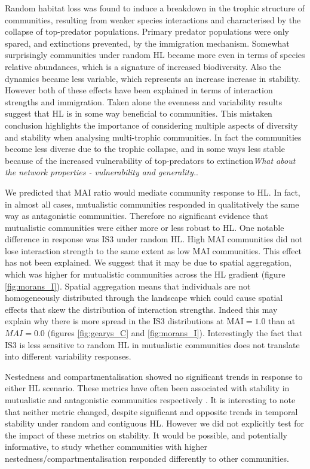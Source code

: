 Random habitat loss was found to induce a breakdown in the trophic structure of communities, resulting from weaker species interactions and characterised by the collapse of top-predator populations. Primary predator populations were only spared, and extinctions prevented, by the immigration mechanism. Somewhat surprisingly communities under random HL became more even in terms of species relative abundances, which is a signature of increased biodiversity. Also the dynamics became less variable, which represents an increase increase in stability. However both of these effects have been explained in terms of interaction strengths and immigration. Taken alone the evenness and variability results suggest that HL is in some way beneficial to communities. This mistaken conclusion highlights the importance of considering multiple aspects of diversity and stability when analysing multi-trophic communities. In fact the communities become less diverse due to the trophic collapse, and in some ways less stable because of the increased vulnerability of top-predators to extinction\emph{What about the network properties - vulnerability and generality.}.

We predicted that MAI ratio would mediate community response to HL. In fact, in almost all cases, mutualistic communities responded in qualitatively the same way as antagonistic communities. Therefore no significant evidence that mutualistic communities were either more or less robust to HL. One notable difference in response was IS3 under random HL. High MAI communities did not lose interaction strength to the same extent as low MAI communities. This effect has not been explained. We suggest that it may be due to spatial aggregation, which was higher for mutualistic communities across the HL gradient (figure \ref{fig:morans_I}). Spatial aggregation means that individuals are not homogeneously distributed through the landscape which could cause spatial effects that skew the distribution of interaction strengths. Indeed this may explain why there is more spread in the IS3 distributions at MAI$=1.0$ than at $MAI=0.0$ (figures \ref{fig:gearys_C} and \ref{fig:morans_I}). Interestingly the fact that IS3 is less sensitive to random HL in mutualistic communities does not translate into different variability responses.

Nestedness and compartmentalisation showed no significant trends in response to either HL scenario. These metrics have often been associated with stability in mutualistic and antagonistic communities respectively \cite{WHAT}. It is interesting to note that neither metric changed, despite significant and opposite trends in temporal stability under random and contiguous HL. However we did not explicitly test for the impact of these metrics on stability. It would be possible, and potentially informative, to study whether communities with higher nestedness/compartmentalisation responded differently to other communities.   

